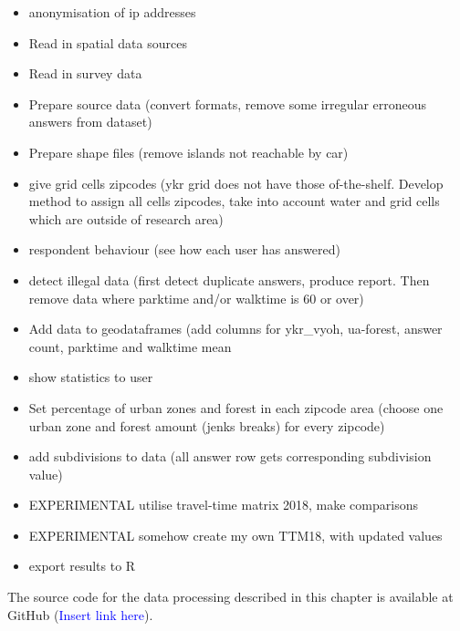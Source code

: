 \begin{itemize}
    \item anonymisation of ip addresses
    \item Read in spatial data sources
    \item Read in survey data
    \item Prepare source data (convert formats, remove some irregular erroneous answers from dataset)
    \item Prepare shape files (remove islands not reachable by car)
    \item give grid cells zipcodes (ykr grid does not have those of-the-shelf. Develop method to assign all cells zipcodes, take into account water and grid cells which are outside of research area)
    \item respondent behaviour (see how each user has answered)
    \item detect illegal data (first detect duplicate answers, produce report. Then remove data where parktime and/or walktime is 60 or over)
    \item Add data to geodataframes (add columns for ykr\_vyoh, ua-forest, answer count, parktime and walktime mean
    \item show statistics to user
    \item Set percentage of urban zones and forest in each zipcode area (choose one urban zone and forest amount (jenks breaks) for every zipcode)
    \item add subdivisions to data (all answer row gets corresponding subdivision value)
    \item EXPERIMENTAL utilise travel-time matrix 2018, make comparisons
    \item EXPERIMENTAL somehow create my own TTM18, with updated values
    \item export results to R
\end{itemize}

The source code for the data processing described in this chapter is available at GitHub (\textcolor{blue}{Insert link here}).

